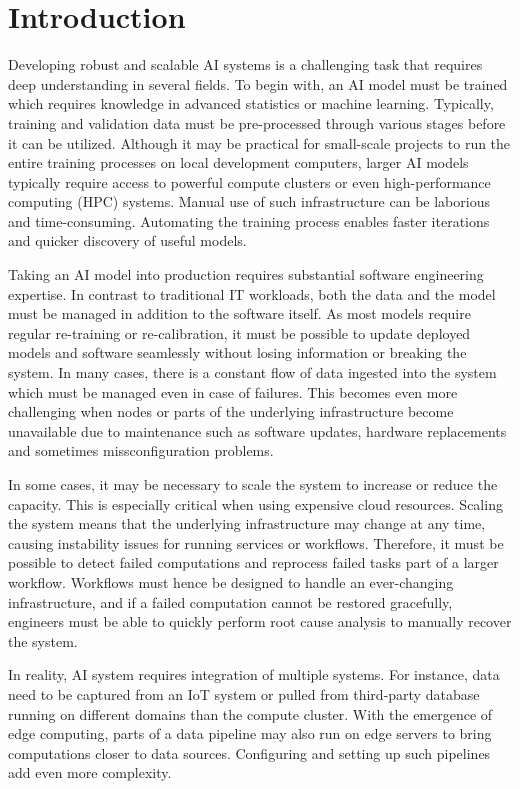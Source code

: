 \documentclass{article}
\begin{document}

\section{Introduction}
Developing robust and scalable AI systems is a challenging task that requires deep understanding in several fields. To begin with, an AI model must be trained which requires knowledge in advanced statistics or machine learning. Typically, training and validation data must be pre-processed through various stages before it can be utilized. Although it may be practical for small-scale projects to run the entire training processes on local development computers, larger AI models typically require access to powerful compute clusters or even  high-performance computing (HPC) systems. Manual use of such infrastructure can be laborious and time-consuming. Automating the training process enables faster iterations and quicker discovery of useful models.

Taking an AI model into production requires substantial software engineering expertise. In contrast to traditional IT workloads, both the data and the model must be managed in addition to the software itself. As most models require regular re-training or re-calibration, it must be possible to update deployed models and software seamlessly without losing information or breaking the system. In many cases, there is a constant flow of data ingested into the system which must be managed even in case of failures. This becomes even more challenging when nodes or parts of the underlying infrastructure become unavailable due to maintenance such as software updates, hardware replacements and sometimes missconfiguration problems.

In some cases, it may be necessary to scale the system to increase or reduce the capacity. This is especially critical when using expensive cloud resources. Scaling the system means that the underlying infrastructure may change at any time, causing instability issues for running services or workflows. Therefore, it must be possible to detect failed computations and reprocess failed tasks part of a larger workflow. Workflows must hence be designed to handle an ever-changing infrastructure, and if a failed computation cannot be restored gracefully, engineers must be able to quickly perform root cause analysis to manually recover the system.

In reality, AI system requires integration of multiple systems. For instance, data need to be captured from an IoT system or pulled from third-party database running on different domains than the compute cluster. With the emergence of edge computing, parts of a data pipeline may also run on edge servers to bring computations closer to data sources. Configuring and setting up such pipelines add even more complexity. 
\end{document}

